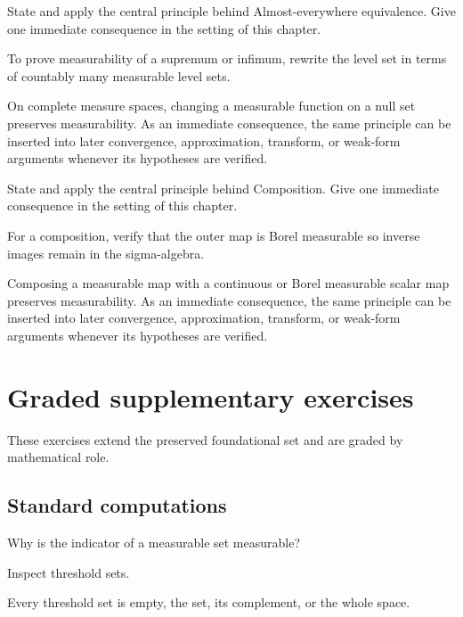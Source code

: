 \begin{exercise}\label{exr:iii02-07}
State and apply the central principle behind Almost-everywhere equivalence. Give one immediate consequence in the setting of this chapter.
\end{exercise}
\begin{hint}
To prove measurability of a supremum or infimum, rewrite the level set in terms of countably many measurable level sets.
\end{hint}
\begin{solution}
On complete measure spaces, changing a measurable function on a null set preserves measurability. As an immediate consequence, the same principle can be inserted into later convergence, approximation, transform, or weak-form arguments whenever its hypotheses are verified.
\end{solution}

\begin{exercise}\label{exr:iii02-08}
State and apply the central principle behind Composition. Give one immediate consequence in the setting of this chapter.
\end{exercise}
\begin{hint}
For a composition, verify that the outer map is Borel measurable so inverse images remain in the sigma-algebra.
\end{hint}
\begin{solution}
Composing a measurable map with a continuous or Borel measurable scalar map preserves measurability. As an immediate consequence, the same principle can be inserted into later convergence, approximation, transform, or weak-form arguments whenever its hypotheses are verified.
\end{solution}


\section{Graded supplementary exercises}
These exercises extend the preserved foundational set and are graded by mathematical role.

\subsection*{Standard computations}

\begin{exercise}[Indicator]\label{exr:iii02-expand-01}
Why is the indicator of a measurable set measurable?
\end{exercise}
\begin{hint}
Inspect threshold sets.
\end{hint}
\begin{solution}
Every threshold set is empty, the set, its complement, or the whole space.
\end{solution}

